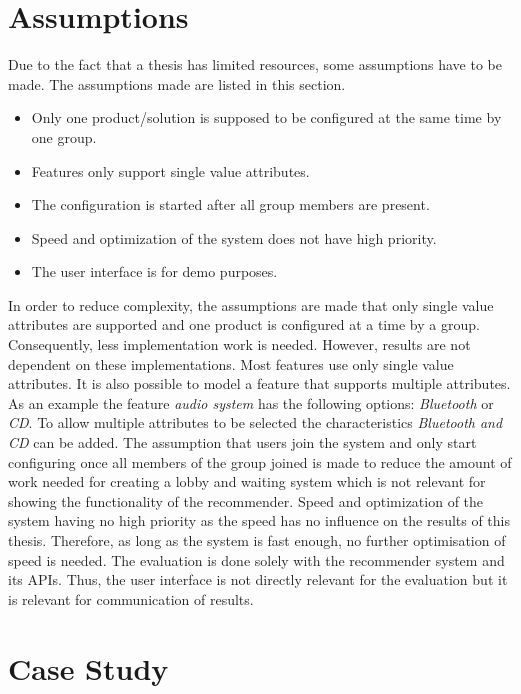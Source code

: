 \section{Assumptions}
\label{sec:Concept:Assumptions}

Due to the fact that a thesis has limited resources, some assumptions have to be made. The assumptions made are listed in this section.

\begin{itemize}
    \item Only one product/solution is supposed to be configured at the same time by one group.
    \item Features only support single value attributes.
    \item The configuration is started after all group members are present.
    \item Speed and optimization of the system does not have high priority.
    \item The user interface is for demo purposes.
\end{itemize}
In order to reduce complexity, the assumptions are made that only single value attributes are supported and one product is configured at a time by a group. Consequently, less implementation work is needed. However, results are not dependent on these implementations. Most features use only single value attributes. It is also possible to model a feature that supports multiple attributes. As an example the feature \emph{audio system} has the following options: \emph{Bluetooth} or \emph{CD}. To allow multiple attributes to be selected the characteristics \emph{Bluetooth and CD} can be added.
The assumption that users join the system and only start configuring once all members of the group joined is made to reduce the amount of work needed for creating a lobby and waiting system which is not relevant for showing the functionality of the recommender. Speed and optimization of the system having no high priority as the speed has no influence on the results of this thesis. Therefore, as long as the system is fast enough, no further optimisation of speed is needed.
The evaluation is done solely with the recommender system and its APIs. Thus, the user interface is not directly relevant for the evaluation but it is relevant for communication of results.

\section{Case Study}
\label{sec:Concept:CaseStudy}

